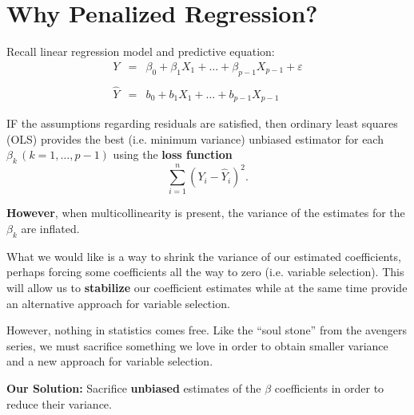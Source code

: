 \documentclass[12pt]{../notes}
\begin{document}

\section{Why Penalized Regression?}

Recall linear regression model and predictive equation:
 \begin{eqnarray}
   Y & = & \beta_0 + \beta_1 X_1 + \ldots + \beta_{p-1}X_{p-1} + \varepsilon \nonumber \\
   & & \nonumber \\
   \hat{Y} & = & b_0 + b_1 X_1 + \ldots + b_{p-1}X_{p-1} \nonumber
 \end{eqnarray}
 
 \nspace
 
 IF the assumptions regarding residuals are satisfied, then ordinary least squares (OLS) provides the best (i.e. minimum variance) unbiased estimator for each $\beta_k \,(k = 1, \ldots, p-1)$ using the \textbf{loss function}
 $$\sum_{i=1}^n\left(Y_i - \hat{Y}_i\right)^2.$$
 
\nspace
\textbf{However}, when multicollinearity is present, the variance of the estimates for the $\beta_k$ are inflated.

What we would like is a way to shrink the variance of our estimated coefficients, perhaps forcing some coefficients all the way to zero (i.e. variable selection). This will allow us to \textbf{stabilize} our coefficient estimates while at the same time provide an alternative approach for variable selection. 

\nspace
However, nothing in statistics comes free. Like the ``soul stone'' from the avengers series, we must sacrifice something we love in order to obtain smaller variance and a new approach for variable selection. 

\nspace
\textbf{Our Solution:} Sacrifice \textbf{unbiased} estimates of the $\beta$ coefficients in order to reduce their variance. 


 \begin{minipage}[l][4cm][c]{\textwidth}
\end{minipage}
\end{document}
